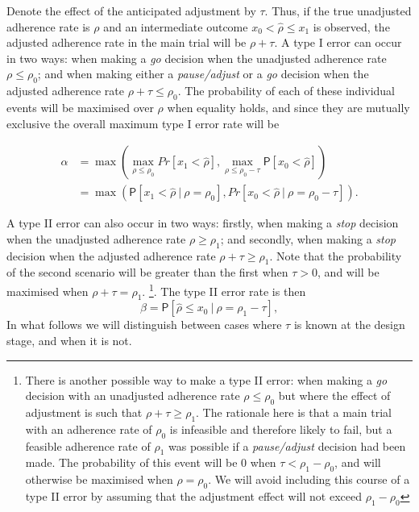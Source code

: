 \documentclass{bmcart}
\newcommand{\PR}{{\mathsf P}}
\begin{document}
Denote the effect of the anticipated adjustment by $\tau$. Thus, if the true unadjusted adherence rate is $\rho$ and an intermediate outcome $x_0 < \hat{\rho} \leq x_1$ is observed, the adjusted adherence rate in the main trial will be $\rho + \tau$. A type I error can occur in two ways: when making a \emph{go} decision when the unadjusted adherence rate $\rho \leq \rho_0$; and when making either a \emph{pause/adjust} or a \emph{go} decision when the adjusted adherence rate $\rho + \tau \leq \rho_0$. The probability of each of these individual events will be maximised over $\rho$ when equality holds, and since they are mutually exclusive the overall maximum type I error rate will be

\begin{align}
    \alpha &= \max \left( \max_{\rho \leq \rho_0} Pr[ x_1 < \hat{\rho}] , \max_{\rho \leq \rho_0 - \tau} \PR[x_0 < \hat{\rho}] \right) \\
    &= \max \left( \PR[ x_1 < \hat{\rho} ~|~ \rho = \rho_0] , Pr[x_0 < \hat{\rho} ~|~ \rho = \rho_0 - \tau] \right).
\end{align}

A type II error can also occur in two ways: firstly, when making a \emph{stop} decision when the unadjusted adherence rate $\rho \geq \rho_1$; and secondly, when making a \emph{stop} decision when the adjusted adherence rate $\rho + \tau \geq \rho_1$. Note that the probability of the second scenario will be greater than the first when $\tau > 0$, and will be maximised when $\rho + \tau = \rho_1$.
\footnote{There is another possible way to make a type II error: when making a \emph{go} decision with an unadjusted adherence rate $\rho \leq \rho_0$ but where the effect of adjustment is such that $\rho + \tau \geq \rho_1$. The rationale here is that a main trial with an adherence rate of $\rho_0$ is infeasible and therefore likely to fail, but a feasible adherence rate of $\rho_1$ was possible if a \emph{pause/adjust} decision had been made.   The probability of this event will be 0 when $\tau < \rho_1 - \rho_0$, and will otherwise be maximised when $\rho = \rho_0$. We will avoid including this course of a type II error by assuming that the adjustment effect will not exceed $\rho_1 - \rho_0$}. 
The type II error rate is then
\begin{equation}
\beta = \PR[\hat{\rho} \leq x_0 ~|~ \rho = \rho_1 - \tau],
\end{equation}
In what follows we will distinguish between cases where $\tau$ is known at the design stage, and when it is not.
\end{document}

